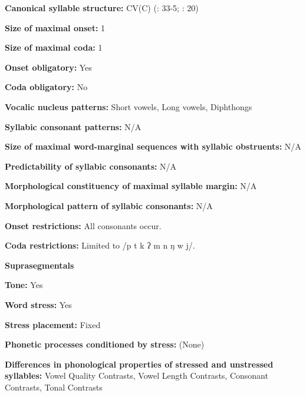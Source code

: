 \textbf{Canonical syllable structure:} CV(C) (\citealt{Enfield2007}: 33-5; \citealt{MorevEtAl1979}: 20)



\textbf{Size of maximal onset:} 1



\textbf{Size of maximal coda:} 1



\textbf{Onset obligatory:} Yes



\textbf{Coda obligatory:} No



\textbf{Vocalic nucleus patterns:} Short vowels, Long vowels, Diphthongs



\textbf{Syllabic consonant patterns:} N/A



\textbf{Size of maximal word{}-marginal sequences with syllabic obstruents:} N/A



\textbf{Predictability of syllabic consonants:} N/A



\textbf{Morphological constituency of maximal syllable margin:} N/A



\textbf{Morphological pattern of syllabic consonants:} N/A



\textbf{Onset restrictions:} All consonants occur. 



\textbf{Coda restrictions:} Limited to /p t k ʔ m n ŋ w j/.



\textbf{Suprasegmentals}



\textbf{Tone:} Yes



\textbf{Word stress:} Yes



\textbf{Stress placement:} Fixed



\textbf{Phonetic processes conditioned by stress:} (None)



\textbf{Differences in phonological properties of stressed and unstressed syllables:} Vowel Quality Contrasts, Vowel Length Contrasts, Consonant Contrasts, Tonal Contrasts



